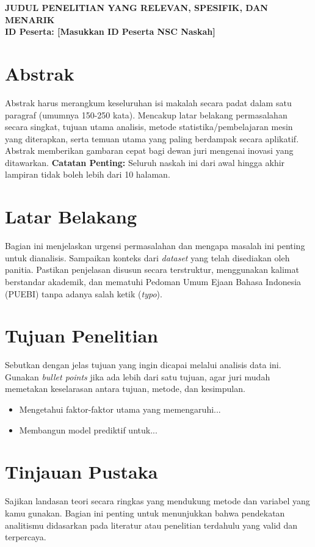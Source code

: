 \documentclass[12pt, a4paper]{article}
\begin{document}
\begin{center}
    {\Large \textbf{JUDUL PENELITIAN YANG RELEVAN, SPESIFIK, DAN MENARIK}} \\
    \vspace{1em} %
    {\large \textbf{ID Peserta: [Masukkan ID Peserta NSC Naskah]}}
\end{center}
\vspace{1.5em}

\section*{Abstrak}
Abstrak harus merangkum keseluruhan isi makalah secara padat dalam satu paragraf (umumnya 150-250 kata). Mencakup latar belakang permasalahan secara singkat, tujuan utama analisis, metode statistika/pembelajaran mesin yang diterapkan, serta temuan utama yang paling berdampak secara aplikatif. Abstrak memberikan gambaran cepat bagi dewan juri mengenai inovasi yang ditawarkan. \textbf{Catatan Penting:} Seluruh naskah ini dari awal hingga akhir lampiran tidak boleh lebih dari 10 halaman.

\section{Latar Belakang}
Bagian ini menjelaskan urgensi permasalahan dan mengapa masalah ini penting untuk dianalisis. Sampaikan konteks dari \textit{dataset} yang telah disediakan oleh panitia. Pastikan penjelasan disusun secara terstruktur, menggunakan kalimat berstandar akademik, dan mematuhi Pedoman Umum Ejaan Bahasa Indonesia (PUEBI) tanpa adanya salah ketik (\textit{typo}).

\section{Tujuan Penelitian}
Sebutkan dengan jelas tujuan yang ingin dicapai melalui analisis data ini. Gunakan \textit{bullet points} jika ada lebih dari satu tujuan, agar juri mudah memetakan keselarasan antara tujuan, metode, dan kesimpulan.
\begin{itemize}
    \item Mengetahui faktor-faktor utama yang memengaruhi...
    \item Membangun model prediktif untuk...
\end{itemize}

\section{Tinjauan Pustaka}
Sajikan landasan teori secara ringkas yang mendukung metode dan variabel yang kamu gunakan. Bagian ini penting untuk menunjukkan bahwa pendekatan analitismu didasarkan pada literatur atau penelitian terdahulu yang valid dan terpercaya.
\end{document}
